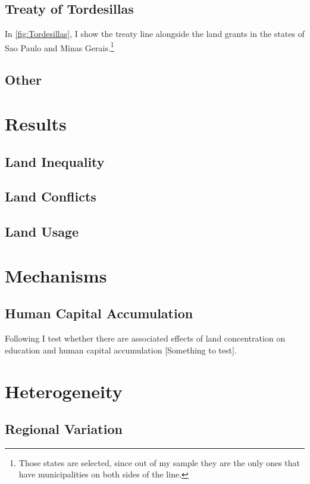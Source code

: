 \documentclass{article}
\begin{document}
\subsection{Treaty of Tordesillas}

In \autoref{fig:Tordesillas}, I show the treaty line alongside the land grants in the states of Sao Paulo and Minas Gerais.\footnote{Those states are selected, since out of my sample they are the only ones that have municipalities on both sides of the line.}

\subsection{Other}

\section{Results}

\subsection{Land Inequality}

\subsection{Land Conflicts}

\subsection{Land Usage}

\section{Mechanisms}

\subsection{Human Capital Accumulation}

Following \textcite{Galor2009-bc} I test whether there are associated effects of land concentration on education and human capital accumulation [Something to test].

\section{Heterogeneity}

\subsection{Regional Variation}
\end{document}
